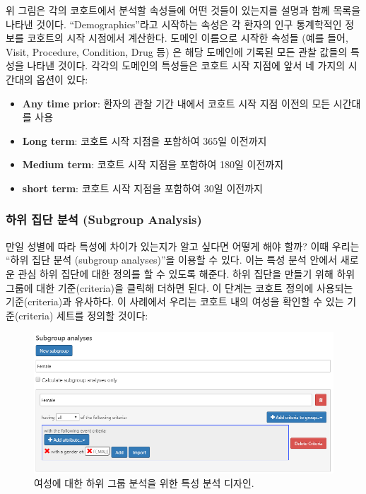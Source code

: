 \documentclass[11pt]{book}
\theoremstyle{definition}
\theoremstyle{definition}
\theoremstyle{definition}
\theoremstyle{remark}
\begin{document}
위 그림은 각의 코호트에서 분석할 속성들에 어떤 것들이 있는지를 설명과
함께 목록을 나타낸 것이다. ``Demographics''라고 시작하는 속성은 각
환자의 인구 통계학적인 정보를 코호트의 시작 시점에서 계산한다. 도메인
이름으로 시작한 속성들 (예를 들어, Visit, Procedure, Condition, Drug 등)
은 해당 도메인에 기록된 모든 관찰 값들의 특성을 나타낸 것이다. 각각의
도메인의 특성들은 코호트 시작 지점에 앞서 네 가지의 시간대의 옵션이
있다:

\begin{itemize}
\item
  \textbf{Any time prior}: 환자의 관찰 기간 내에서 코호트 시작 지점
  이전의 모든 시간대를 사용
\item
  \textbf{Long term}: 코호트 시작 지점을 포함하여 365일 이전까지
\item
  \textbf{Medium term}: 코호트 시작 지점을 포함하여 180일 이전까지
\item
  \textbf{short term}: 코호트 시작 지점을 포함하여 30일 이전까지
\end{itemize}

\subsubsection*{하위 집단 분석 (Subgroup
Analysis)}\label{---subgroup-analysis}

만일 성별에 따라 특성에 차이가 있는지가 알고 싶다면 어떻게 해야 할까?
이때 우리는 ``하위 집단 분석 (subgroup analyses)''을 이용할 수 있다.
이는 특성 분석 안에서 새로운 관심 하위 집단에 대한 정의를 할 수 있도록
해준다. 하위 집단을 만들기 위해 하위 그룹에 대한 기준(criteria)을 클릭해
더하면 된다. 이 단계는 코호트 정의에 사용되는 기준(criteria)과 유사하다.
이 사례에서 우리는 코호트 내의 여성을 확인할 수 있는 기준(criteria)
세트를 정의할 것이다:

\begin{figure}

{\centering \includegraphics[width=1\linewidth]{images/Characterization/atlasCharacterizationSubgroup} 

}

\caption{여성에 대한 하위 그룹 분석을 위한 특성 분석 디자인.}\label{fig:atlasCharacterizationSubgroup}
\end{figure}
\end{document}
